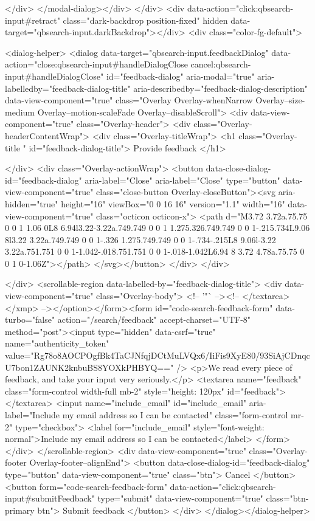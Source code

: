     </div>
</modal-dialog></div>
  </div>
  <div data-action="click:qbsearch-input#retract" class="dark-backdrop position-fixed" hidden data-target="qbsearch-input.darkBackdrop"></div>
  <div class="color-fg-default">
    
<dialog-helper>
  <dialog data-target="qbsearch-input.feedbackDialog" data-action="close:qbsearch-input#handleDialogClose cancel:qbsearch-input#handleDialogClose" id="feedback-dialog" aria-modal="true" aria-labelledby="feedback-dialog-title" aria-describedby="feedback-dialog-description" data-view-component="true" class="Overlay Overlay-whenNarrow Overlay--size-medium Overlay--motion-scaleFade Overlay--disableScroll">
    <div data-view-component="true" class="Overlay-header">
  <div class="Overlay-headerContentWrap">
    <div class="Overlay-titleWrap">
      <h1 class="Overlay-title " id="feedback-dialog-title">
        Provide feedback
      </h1>
        
    </div>
    <div class="Overlay-actionWrap">
      <button data-close-dialog-id="feedback-dialog" aria-label="Close" aria-label="Close" type="button" data-view-component="true" class="close-button Overlay-closeButton"><svg aria-hidden="true" height="16" viewBox="0 0 16 16" version="1.1" width="16" data-view-component="true" class="octicon octicon-x">
    <path d="M3.72 3.72a.75.75 0 0 1 1.06 0L8 6.94l3.22-3.22a.749.749 0 0 1 1.275.326.749.749 0 0 1-.215.734L9.06 8l3.22 3.22a.749.749 0 0 1-.326 1.275.749.749 0 0 1-.734-.215L8 9.06l-3.22 3.22a.751.751 0 0 1-1.042-.018.751.751 0 0 1-.018-1.042L6.94 8 3.72 4.78a.75.75 0 0 1 0-1.06Z"></path>
</svg></button>
    </div>
  </div>
  
</div>
      <scrollable-region data-labelled-by="feedback-dialog-title">
        <div data-view-component="true" class="Overlay-body">        <!-- '"` --><!-- </textarea></xmp> --></option></form><form id="code-search-feedback-form" data-turbo="false" action="/search/feedback" accept-charset="UTF-8" method="post"><input type="hidden" data-csrf="true" name="authenticity_token" value="Rg78o8AOCPOgfBk4TaCJNfqjDCtMuLVQx6/IiFis9XyE80/93SiAjCDnqcU7bon1ZAUNK2knbuBS8YOXkPHBYQ==" />
          <p>We read every piece of feedback, and take your input very seriously.</p>
          <textarea name="feedback" class="form-control width-full mb-2" style="height: 120px" id="feedback"></textarea>
          <input name="include_email" id="include_email" aria-label="Include my email address so I can be contacted" class="form-control mr-2" type="checkbox">
          <label for="include_email" style="font-weight: normal">Include my email address so I can be contacted</label>
</form></div>
      </scrollable-region>
      <div data-view-component="true" class="Overlay-footer Overlay-footer--alignEnd">          <button data-close-dialog-id="feedback-dialog" type="button" data-view-component="true" class="btn">    Cancel
</button>
          <button form="code-search-feedback-form" data-action="click:qbsearch-input#submitFeedback" type="submit" data-view-component="true" class="btn-primary btn">    Submit feedback
</button>
</div>
</dialog></dialog-helper>

